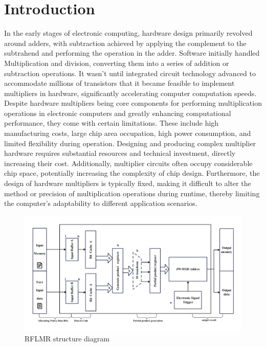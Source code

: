 \documentclass[electronics,article,accept,pdftex,moreauthors]{Definitions/mdpi}
\begin{document}
\section{Introduction}
In the early stages of electronic computing, hardware design primarily revolved around adders, with subtraction achieved by applying the complement to the subtrahend and performing the operation in the adder. Software initially handled Multiplication and division, converting them into a series of addition or subtraction operations. It wasn’t until integrated circuit technology advanced to accommodate millions of transistors that it became feasible to implement multipliers in hardware, significantly accelerating computer computation speeds. Despite hardware multipliers being core components for performing multiplication operations in electronic computers and greatly enhancing computational performance, they come with certain limitations. These include high manufacturing costs, large chip area occupation, high power consumption, and limited flexibility during operation. Designing and producing complex multiplier hardware requires substantial resources and technical investment, directly increasing their cost. Additionally, multiplier circuits often occupy considerable chip space, potentially increasing the complexity of chip design. Furthermore, the design of hardware multipliers is typically fixed, making it difficult to alter the method or precision of multiplication operations during runtime, thereby limiting the computer’s adaptability to different application scenarios.

\begin{figure}[H]
    \includegraphics[scale=0.5]{./images/1.pdf}
    \caption{RFLMR  structure diagram}
    \label{fig1}
\end{figure}
\end{document}
